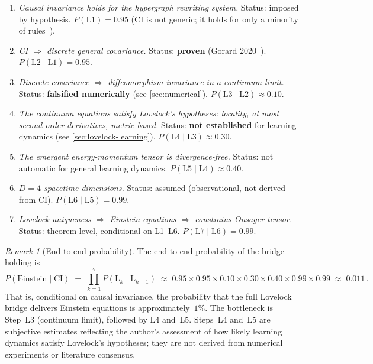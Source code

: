 \documentclass[11pt]{article}
\theoremstyle{definition}
\theoremstyle{remark}
\newtheorem{remark}[theorem]{Remark}
\begin{document}
\begin{enumerate}
\item[\textbf{L1.}] \textit{Causal invariance holds for the hypergraph
  rewriting system.}
  Status: imposed by hypothesis.
  $P(\text{L1}) = 0.95$ (CI is not generic; it holds for only a minority
  of rules~\cite{Wolfram2020,Gorard2020}).

\item[\textbf{L2.}] \textit{CI $\Rightarrow$ discrete general covariance.}
  Status: \textbf{proven} (Gorard 2020~\cite{Gorard2020}).
  $P(\text{L2} \mid \text{L1}) = 0.95$.

\item[\textbf{L3.}] \textit{Discrete covariance $\Rightarrow$
  diffeomorphism invariance in a continuum limit.}
  Status: \textbf{falsified numerically} (see \cref{sec:numerical}).
  $P(\text{L3} \mid \text{L2}) \approx 0.10$.

\item[\textbf{L4.}] \textit{The continuum equations satisfy Lovelock's
  hypotheses: locality, at most second-order derivatives, metric-based.}
  Status: \textbf{not established} for learning dynamics
  (see \cref{sec:lovelock-learning}).
  $P(\text{L4} \mid \text{L3}) \approx 0.30$.

\item[\textbf{L5.}] \textit{The emergent energy-momentum tensor is
  divergence-free.}
  Status: not automatic for general learning dynamics.
  $P(\text{L5} \mid \text{L4}) \approx 0.40$.

\item[\textbf{L6.}] \textit{$D = 4$ spacetime dimensions.}
  Status: assumed (observational, not derived from CI).
  $P(\text{L6} \mid \text{L5}) = 0.99$.

\item[\textbf{L7.}] \textit{Lovelock uniqueness $\Rightarrow$ Einstein
  equations $\Rightarrow$ constrains Onsager tensor.}
  Status: theorem-level, conditional on L1--L6.
  $P(\text{L7} \mid \text{L6}) = 0.99$.
\end{enumerate}

\begin{remark}[End-to-end probability]
\label{rem:probability}
The end-to-end probability of the bridge holding is
\begin{equation}
\label{eq:bridge-probability}
P(\text{Einstein} \mid \text{CI}) \;=\;
\prod_{k=1}^{7} P(\text{L}_k \mid \text{L}_{k-1})
\;\approx\; 0.95 \times 0.95 \times 0.10 \times 0.30 \times 0.40 \times 0.99 \times 0.99
\;\approx\; 0.011\,.
\end{equation}
That is, conditional on causal invariance, the probability that the full
Lovelock bridge delivers Einstein equations is approximately~$1\%$.
The bottleneck is Step~L3 (continuum limit), followed by L4 and~L5.
Steps~L4 and~L5 are subjective estimates reflecting the author's
assessment of how likely learning dynamics satisfy Lovelock's
hypotheses; they are not derived from numerical experiments or
literature consensus.
\end{remark}
\end{document}
